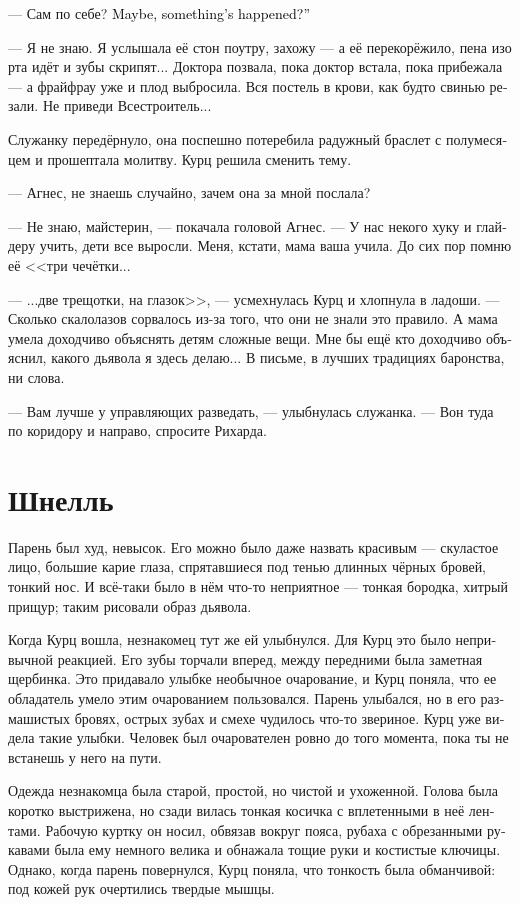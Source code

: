 \documentclass[a4paper,12pt,fleqn]{book}\usepackage{cooltooltips}\usepackage{polyglossia}\setdefaultlanguage[babelshorthands=true]{russian}\setotherlanguage{english}\defaultfontfeatures{Ligatures=TeX,Mapping=tex-text} \usepackage{xcolor}\definecolor{lightgray}{HTML}{bbbbbb}\color{lightgray}\newcommand{\ml}[3]{\textenglish{\textcolor{black}{#3}}}
\begin{document}
--- Сам по себе?
\ml{$0$}
{Может, случилось чего?}
{Maybe, something's happened?''}

--- Я не знаю.
Я услышала её стон поутру, захожу --- а её перекорёжило, пена изо рта идёт и зубы скрипят...
Доктора позвала, пока доктор встала, пока прибежала --- а фрайфрау уже и плод выбросила.
Вся постель в крови, как будто свинью резали.
Не приведи Всестроитель...

Служанку передёрнуло, она поспешно потеребила радужный браслет с полумесяцем и прошептала молитву.
Курц решила сменить тему.

--- Агнес, не знаешь случайно, зачем она за мной послала?

--- Не знаю, майстерин, --- покачала головой Агнес.
--- У нас некого хуку и глайдеру учить, дети все выросли.
Меня, кстати, мама ваша учила.
До сих пор помню её <<три чечётки...

--- ...две трещотки, на глазок>>, --- усмехнулась Курц и хлопнула в ладоши.
--- Сколько скалолазов сорвалось из-за того, что они не знали это правило.
А мама умела доходчиво объяснять детям сложные вещи.
Мне бы ещё кто доходчиво объяснил, какого дьявола я здесь делаю...
В письме, в лучших традициях баронства, ни слова.

--- Вам лучше у управляющих разведать, --- улыбнулась служанка.
--- Вон туда по коридору и направо, спросите Рихарда.

\section{Шнелль}

Парень был худ, невысок.
Его можно было даже назвать красивым --- скуластое лицо, большие карие глаза, спрятавшиеся под тенью длинных чёрных бровей, тонкий нос.
И всё-таки было в нём что-то неприятное --- тонкая бородка, хитрый прищур;
таким рисовали образ дьявола.

Когда Курц вошла, незнакомец тут же ей улыбнулся.
Для Курц это было непривычной реакцией.
Его зубы торчали вперед, между передними была заметная щербинка.
Это придавало улыбке необычное очарование, и Курц поняла, что ее обладатель умело этим очарованием пользовался.
Парень улыбался, но в его размашистых бровях, острых зубах и смехе чудилось что-то звериное.
Курц уже видела такие улыбки.
Человек был очарователен ровно до того момента, пока ты не встанешь у него на пути.

Одежда незнакомца была старой, простой, но чистой и ухоженной.
Голова была коротко выстрижена, но сзади вилась тонкая косичка с вплетенными в неё лентами.
Рабочую куртку он носил, обвязав вокруг пояса, рубаха с обрезанными рукавами была ему немного велика и обнажала тощие руки и костистые ключицы.
Однако, когда парень повернулся, Курц поняла, что тонкость была обманчивой: под кожей рук очертились твердые мышцы. 
\end{document}
